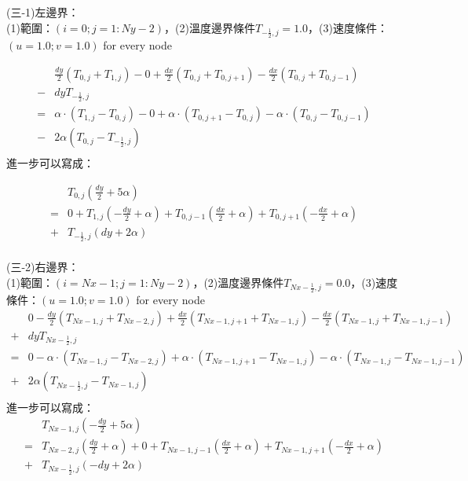 \documentclass[12pt]{article}
\begin{document}
\noindent (三-1)左邊界：\\

(1)範圍：$(i = 0 ; j = 1 : Ny - 2)$，(2)溫度邊界條件$T_{-\frac{1}{2},j} = 1.0$，(3)速度條件：$(u = 1.0 ; v = 1.0)$ for every node

\begin{equation}
  \begin{split}
    &\frac{dy}{2}(T_{0,j}+T_{1,j}) - 0 + \frac{dx}{2}(T_{0,j}+T_{0,j+1}) - \frac{dx}{2}(T_{0,j}+T_{0,j-1}) \\ -&  dyT_{-\frac{1}{2},j} \\
    = &\alpha \cdot (T_{1,j} - T_{0,j}) - 0 + \alpha \cdot (T_{0,j+1} - T_{0,j}) -\alpha \cdot (T_{0,j} - T_{0,j-1}) \\-& 2 \alpha (T_{0,j} - T_{-\frac{1}{2} , j}) \\
  \end{split}
\end{equation}
\noindent 進一步可以寫成：

\begin{equation}
  \begin{split}
    &T_{0,j}(\frac{dy}{2}+5\alpha )\\
    =& 0 + T_{1,j}(-\frac{dy}{2}+\alpha)+ T_{0,j-1}(\frac{dx}{2}+\alpha)+T_{0,j+1}(-\frac{dx}{2}+\alpha)\\+&T_{-\frac{1}{2},j}(dy+2\alpha) \\
  \end{split}
\end{equation}

\noindent (三-2)右邊界：\\

(1)範圍：$(i = Nx-1 ; j = 1 : Ny - 2)$，(2)溫度邊界條件$T_{Nx-\frac{1}{2},j} = 0.0$，(3)速度條件：$(u = 1.0 ; v = 1.0)$ for every node\\
\begin{equation}
  \begin{split}
    &0-\frac{dy}{2}(T_{Nx-1,j}+T_{Nx-2,j}) + \frac{dx}{2}(T_{Nx-1,j+1}+T_{Nx-1,j}) - \frac{dx}{2}(T_{Nx-1,j}+T_{Nx-1,j-1}) \\+&  dyT_{Nx-\frac{1}{2},j} \\
    = &0-\alpha \cdot (T_{Nx-1,j}-T_{Nx-2,j}) + \alpha \cdot (T_{Nx-1,j+1} - T_{Nx-1,j}) -\alpha \cdot (T_{Nx-1,j} - T_{Nx-1,j-1}) \\ 
    + &2 \alpha (T_{Nx-\frac{1}{2} , j}-T_{Nx-1,j}) \\
  \end{split}
\end{equation}
\noindent 進一步可以寫成：\\
\begin{equation}
  \begin{split}
    &T_{Nx-1,j}(-\frac{dy}{2}+5\alpha )\\
    =&T_{Nx-2,j}(\frac{dy}{2}+\alpha) + 0 +T_{Nx-1,j-1}(\frac{dx}{2}+\alpha)+T_{Nx-1,j+1}(-\frac{dx}{2}+\alpha)\\
    +&T_{Nx-\frac{1}{2},j}(-dy+2\alpha) \\
  \end{split}
\end{equation}
\end{document}
